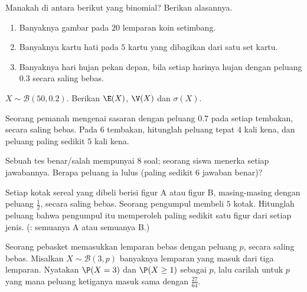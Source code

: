 \begin{exercise}[$\star$]\label{exo:g11:binom:3}
Manakah di antara berikut yang binomial? Berikan alasannya.
\begin{enumerate}
  \item Banyaknya gambar pada $20$ lemparan koin setimbang.
  \item Banyaknya kartu hati pada $5$ kartu yang dibagikan dari satu set kartu.
  \item Banyaknya hari hujan pekan depan, bila setiap harinya hujan dengan
        peluang $0.3$ secara saling bebas.
\end{enumerate}
\end{exercise}

\begin{exercise}[$\star$]\label{exo:g11:binom:4}
$X \sim \mathcal B(50, 0.2)$. Berikan $\E(X)$, $\V(X)$ dan $\sigma(X)$.
\end{exercise}

\begin{exercise}[$\star\star$]\label{exo:g11:binom:5}
Seorang pemanah mengenai sasaran dengan peluang $0.7$ pada setiap tembakan,
secara saling bebas. Pada $6$ tembakan, hitunglah peluang tepat $4$ kali kena,
dan peluang paling sedikit $5$ kali kena.
\end{exercise}

\begin{exercise}[$\star\star$]\label{exo:g11:binom:6}
Sebuah tes benar/salah mempunyai $8$ soal; seorang siswa menerka setiap
jawabannya. Berapa peluang ia lulus (paling sedikit $6$ jawaban benar)?
\end{exercise}

\begin{exercise}[$\star\star$]\label{exo:g11:binom:7}
Setiap kotak sereal yang dibeli berisi figur A atau figur B, masing-masing
dengan peluang $\frac12$, secara saling bebas. Seorang pengumpul membeli $5$
kotak. Hitunglah peluang bahwa pengumpul itu memperoleh paling sedikit satu
figur dari setiap jenis. (: semuanya A atau semuanya B.)
\end{exercise}

\begin{exercise}[$\star\star$]\label{exo:g11:binom:8}
Seorang pebasket memasukkan lemparan bebas dengan peluang $p$,
secara saling bebas. Misalkan $X \sim \mathcal B(3, p)$ banyaknya lemparan yang
masuk dari tiga lemparan. Nyatakan $\P(X = 3)$ dan $\P(X \geq 1)$ sebagai 
$p$, lalu carilah untuk $p$ yang mana peluang ketiganya masuk sama dengan
$\frac{27}{64}$.
\end{exercise}

